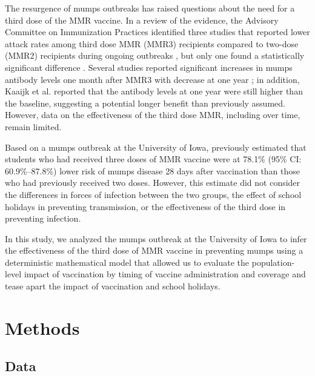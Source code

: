 \documentclass[12pt]{article}
\begin{document}
The resurgence of mumps outbreaks has raised questions about the need for a third dose of the MMR vaccine.
In a review of the evidence, the Advisory Committee on Immunization Practices \citep{marin2018recommendation} identified three studies that reported lower attack rates among third dose MMR (MMR3) recipients compared to two-dose (MMR2) recipients during ongoing outbreaks \citep{ogbuanu2012impact,nelson2013epidemiology,cardemil2017effectiveness}, but only one found a statistically significant difference \citep{cardemil2017effectiveness}. 
Several studies reported significant increases in mumps antibody levels one month after MMR3 with decrease at one year \citep{fiebelkorn2014mumps,latner2017mumps,kaaijk2020third};
in addition, Kaaijk et al. reported that the antibody levels at one year were still higher than the baseline, suggesting a potential longer benefit than previously assumed. 
However, data on the effectiveness of the third dose MMR, including over time, remain limited.

Based on a mumps outbreak at the University of Iowa, \cite{cardemil2017effectiveness} previously estimated that students who had received three doses of MMR vaccine were at 78.1\% (95\% CI: 60.9\%--87.8\%) lower risk of mumps disease 28 days after vaccination than those who had previously received two doses.
However, this estimate did not consider the differences in forces of infection between the two groups, the effect of school holidays in preventing transmission, or the effectiveness of the third dose in preventing infection. 

In this study, we analyzed the mumps outbreak at the University of Iowa to infer the effectiveness of the third dose of MMR vaccine in preventing mumps using a deterministic mathematical model that allowed us to evaluate the population-level impact of vaccination by timing of vaccine administration and coverage and tease apart the impact of vaccination and school holidays.

\section{Methods}

\subsection{Data}
\end{document}
